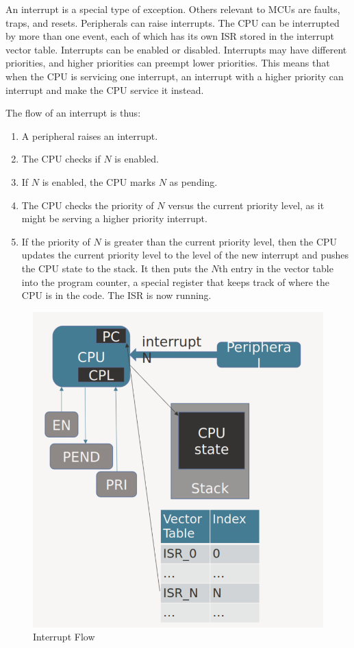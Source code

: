 An interrupt is a special type of exception. Others relevant to MCUs are
faults, traps, and resets. Peripherals can raise interrupts. The
CPU can be interrupted by more than one event, each of which has its own
ISR stored in the interrupt vector table. Interrupts can be enabled or
disabled. Interrupts may have different priorities, and higher priorities
can preempt lower priorities. This means that when the CPU is servicing
one interrupt, an interrupt with a higher priority can interrupt and make
the CPU service it instead.

The flow of an interrupt is thus:
\begin{enumerate}
    \item A peripheral raises an interrupt.
    \item The CPU checks if $N$ is enabled.
    \item If $N$ is enabled, the CPU marks $N$ as pending.
    \item The CPU checks the priority of $N$ versus the current
          priority level, as it might be serving a higher priority interrupt.
    \item If the priority of $N$ is greater than the current priority
          level, then the CPU updates the current priority level to the level of
          the new interrupt and pushes the CPU state to the stack.
          It then puts the $N$th entry in the vector table into the program
          counter, a special register that keeps track of where the CPU
          is in the code. The ISR is now running.
\end{enumerate}
\begin{figure}
    \includegraphics{images/interrupt_flow.png}
    \caption{Interrupt Flow}
    \label{fig:interrupt}
\end{figure}

